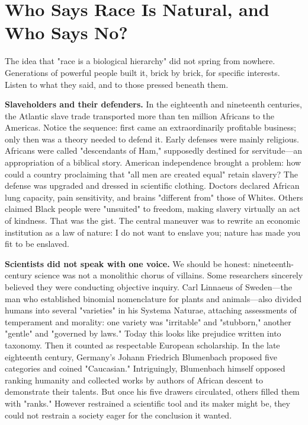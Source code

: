 \section{Who Says Race Is Natural, and Who Says No?}
The idea that "race is a biological hierarchy" did not spring from nowhere. Generations of powerful people built it, brick by brick, for specific interests. Listen to what they said, and to those pressed beneath them.

\textbf{Slaveholders and their defenders.} In the eighteenth and nineteenth centuries, the Atlantic slave trade transported more than ten million Africans to the Americas. Notice the sequence: first came an extraordinarily profitable business; only then was a theory needed to defend it. Early defenses were mainly religious. Africans were called "descendants of Ham," supposedly destined for servitude---an appropriation of a biblical story. American independence brought a problem: how could a country proclaiming that "all men are created equal" retain slavery? The defense was upgraded and dressed in scientific clothing. Doctors declared African lung capacity, pain sensitivity, and brains "different from" those of Whites. Others claimed Black people were "unsuited" to freedom, making slavery virtually an act of kindness. That was the gist. The central maneuver was to rewrite an economic institution as a law of nature: I do not want to enslave you; nature has made you fit to be enslaved.

\textbf{Scientists did not speak with one voice.} We should be honest: nineteenth-century science was not a monolithic chorus of villains. Some researchers sincerely believed they were conducting objective inquiry. Carl Linnaeus of Sweden---the man who established binomial nomenclature for plants and animals---also divided humans into several "varieties" in his Systema Naturae, attaching assessments of temperament and morality: one variety was "irritable" and "stubborn," another "gentle" and "governed by laws." Today this looks like prejudice written into taxonomy. Then it counted as respectable European scholarship. In the late eighteenth century, Germany's Johann Friedrich Blumenbach proposed five categories and coined "Caucasian." Intriguingly, Blumenbach himself opposed ranking humanity and collected works by authors of African descent to demonstrate their talents. But once his five drawers circulated, others filled them with "ranks." However restrained a scientific tool and its maker might be, they could not restrain a society eager for the conclusion it wanted.


